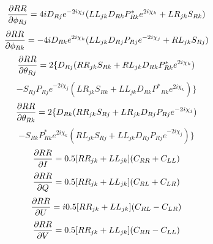 $${\partial RR \over{\partial \phi_{Rj}}} =
   4i D_{Rj} e^{-2i\chi_j}
   (LL_{jk} D_{Rk} P^*_{Rk}
   e^{2i\chi_k} + LR_{jk} {S_{Rk}}) $$
$${\partial RR \over{\partial \phi_{Rk}}} =
    -4iD_{Rk} e^{2i\chi_k}
   (LL_{jk}  {D_{Rj}} {P_{Rj}}
   e^{-2i\chi_j} + RL_{jk}  {S_{Rj}})$$
$${\partial RR \over{\partial \theta_{Rj}}} =
    2\{D_{Rj} (RR_{jk}
   {S_{Rk}} + RL_{jk}    D_{Rk} P^*_{Rk} e^{2i\chi_k}) $$
   $$- S_{Rj} P_{Rj} e^{-2i\chi_j} (LR_{jk}
   {S_{Rk}} + LL_{jk}  {D_{Rk} {P^*}_{Rk}} e^{2i\chi_k})\} $$
$${\partial RR \over{\partial \theta_{Rk}}} =
    2\{D_{Rk} (RR_{jk}  {S_{Rj}} + LR_{jk}  {D_{Rj}} {P_{Rj}}
   e^{-2i\chi_j}) $$
   $$-S_{Rk} P^*_{Rk} e^{2i\chi_k} (RL_{jk}  {S_{Rj}} + LL_{jk}
   {D_{Rj}} {P_{Rj}} e^{-2i\chi_j})\} $$
$${\partial RR \over{\partial I}} =
   0.5[RR_{jk} + LL_{jk}] (C_{RR} + C_{LL})$$
$${\partial RR \over{\partial Q}} =
   0.5[RR_{jk} + LL_{jk}] (C_{RL} + C_{LR})$$
$${\partial RR \over{\partial U}} =
   i 0.5[RR_{jk} + LL_{jk}] (C_{RL} - C_{LR}) $$
$${\partial RR \over{\partial V}} =
   0.5[RR_{jk} + LL_{jk}] (C_{RR} - C_{LL}) $$


